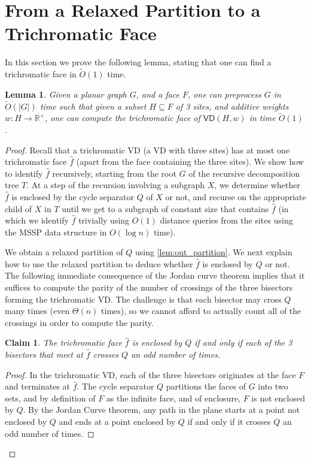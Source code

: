 \documentclass{article}
\newcommand{\VD}{\textsf{VD}}
\newcommand{\X}{X}
\newtheorem{claim}{Claim}
\newtheorem{lemma}{Lemma}
\newcommand{\R}{\mathbb{R}}
\newcommand{\Otild}{\tilde{O}}
\begin{document}
\section{From a Relaxed Partition to a Trichromatic Face}\label{sec:partition_to_trichromatic}
In this section we prove the following lemma, stating that one can find a trichromatic face in $\Otild(1)$ time.

\begin{lemma}\label{lem:trichromatic}
    Given a planar graph $G$, and a face $F$, one can preprocess $G$ in $\Otild(|G|)$ time such that given a subset $H\subseteq F$ of 3 sites, and additive weights $w: H \rightarrow \R^+$, one can compute the trichromatic face of $\VD(H,w)$ in time $\Otild(1)$.
\end{lemma}
\begin{proof}
Recall that a trichromatic VD (a VD with three sites) has at most one trichromatic face $\hat f$ (apart from the face containing the three sites). We show how to identify $\hat f$ recursively, starting from the root $G$ of the recursive decomposition tree $T$. At a step of the recursion involving a subgraph $\X$, we determine whether $\hat f$ is enclosed by the cycle separator $Q$ of $\X$ or not, and recurse on the appropriate child of $\X$ in $T$ until we get to a subgraph of constant size that contains $\hat f$ (in which we identify $\hat f$ trivially using $O(1)$ distance queries from the sites using the MSSP data structure in $O(\log n)$ time).

We obtain a relaxed partition of $Q$ using \cref{lem:out_partition}. We next  explain how to use the relaxed partition to deduce whether $\hat f$ is enclosed by $Q$ or not.
The following immediate consequence of the Jordan curve theorem implies that it suffices to compute the parity of the number of crossings of the three bisectors forming the trichromatic VD.
The challenge is that each bisector may cross $Q$ many times (even $\Theta(n)$ times), so we cannot afford to actually count all of the crossings in order to compute the parity.

\begin{claim}
    The trichromatic face $\hat f$ is enclosed by $Q$ if and only if each of the 3 bisectors that meet at $\hat f$ crosses $Q$ an odd number of times.
\end{claim}
\begin{proof}
    In the trichromatic VD, each of the three bisectors originates at the face $F$ and terminates at $\hat f$. The cycle separator $Q$ partitions the faces of $G$ into two sets, and by definition of $F$ as the infinite face, and of enclosure, $F$ is not enclosed by $Q$. By the Jordan Curve theorem, any path in the plane starts at a point not enclosed by $Q$ and ends at a point enclosed by $Q$ if and only if it crosses $Q$ an odd number of times.
\end{proof}


\end{proof}
\end{document}
